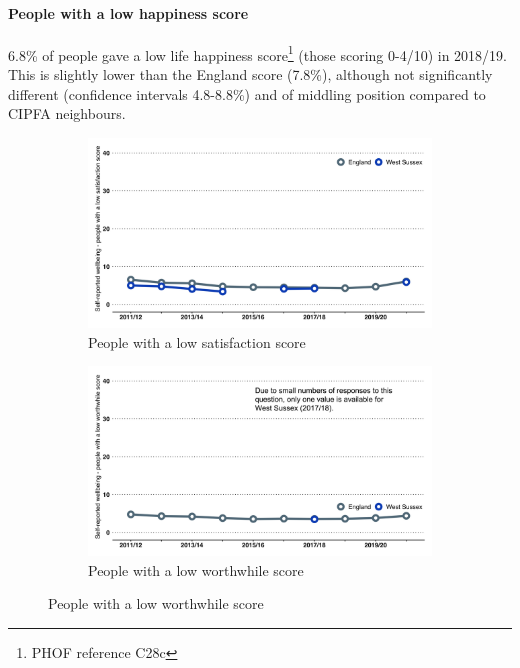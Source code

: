 \paragraph{People with a low happiness score} 6.8\% of people gave a low life happiness score\footnote{PHOF reference C28c} (those scoring 0-4/10) in 2018/19. This is slightly lower than the England score (7.8\%), although not significantly different (confidence intervals 4.8-8.8\%) and of middling position compared to CIPFA neighbours.

\begin{figure}
    \caption[Measurement of wellbeing in the Integrated Household Survey.]{Measurement of wellbeing in the Integrated Household Survey.}\label{fig:wellb-survey}
    \vspace*{3mm}
    \centering
    \begin{subfigure}[b]{0.48\textwidth}
        \centering
        \caption{People with a low satisfaction score}\label{fig:wellb-surv:satis}
        \includegraphics[width=\textwidth]{images/low_satisfaction_line.png}
    \end{subfigure}
    \begin{subfigure}[b]{0.48\textwidth}
        \centering
        \caption{People with a low worthwhile score}\label{fig:wellb-surv:loww}
        \includegraphics[width=\textwidth]{images/low_worthwhile_line.png}

\end{subfigure}
\end{figure}
